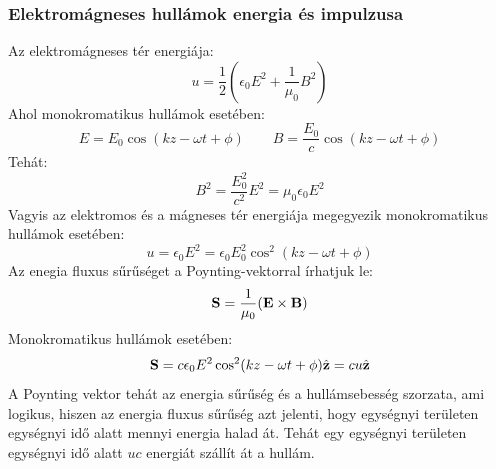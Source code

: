 \documentclass[../main.tex]{subfiles}
\begin{document}
\subsubsection{Elektromágneses hullámok energia és impulzusa}
Az elektromágneses tér energiája:
\begin{equation}
    u = \frac{1}{2} \left( \epsilon_0 E^2 + \frac{1}{\mu_0} B^2 \right)
\end{equation}
Ahol monokromatikus hullámok esetében:
\begin{equation}
    E = E_0 \cos(kz - \omega t + \phi) \qquad B = \frac{E_0}{c} \cos(kz - \omega t + \phi)
\end{equation}
Tehát:
\begin{equation}
    B^2 = \frac{E_0^2}{c^2} E^2 = \mu_0 \epsilon_0 E^2
\end{equation}
Vagyis az elektromos és a mágneses tér energiája megegyezik monokromatikus hullámok esetében:
\begin{equation}
    u = \epsilon_0 E^2 = \epsilon_0 E_0^2 \cos^2(kz - \omega t + \phi)
\end{equation}
Az enegia fluxus sűrűséget a Poynting-vektorral írhatjuk le:
\begin{equation}
    \bold{S} = \frac{1}{\mu_0} (\bold{E} \times \bold{B})
\end{equation}
Monokromatikus hullámok esetében:
\begin{equation}
    \bold{S} = c\epsilon_0 E^2 \cos^2(kz - \omega t + \phi) \hat{\bold{z}} = cu \hat{\bold{z}}
\end{equation}
A Poynting vektor tehát az energia sűrűség és a hullámsebesség szorzata, ami logikus, hiszen az energia fluxus sűrűség azt jelenti, hogy egységnyi területen egységnyi idő alatt mennyi energia halad át.
Tehát egy egységnyi területen egységnyi idő alatt $uc$ energiát szállít át a hullám.
\end{document}
